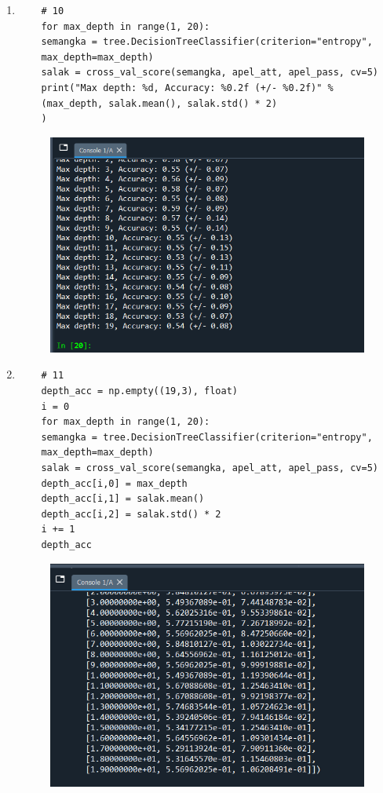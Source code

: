 \begin{enumerate}
\begin{figure}[!htbp]
\end{figure}
\item 
\begin{verbatim}
	# 10
	for max_depth in range(1, 20):
	semangka = tree.DecisionTreeClassifier(criterion="entropy", 
	max_depth=max_depth)
	salak = cross_val_score(semangka, apel_att, apel_pass, cv=5)
	print("Max depth: %d, Accuracy: %0.2f (+/- %0.2f)" % 
	(max_depth, salak.mean(), salak.std() * 2)
	)
\end{verbatim}
\begin{figure}[!htbp]
	\centering
	\includegraphics[scale=0.8]{figures/10.PNG}
\end{figure}
\newpage
\item
\begin{verbatim}
	# 11
	depth_acc = np.empty((19,3), float)
	i = 0
	for max_depth in range(1, 20):
	semangka = tree.DecisionTreeClassifier(criterion="entropy", 
	max_depth=max_depth)
	salak = cross_val_score(semangka, apel_att, apel_pass, cv=5)
	depth_acc[i,0] = max_depth
	depth_acc[i,1] = salak.mean()
	depth_acc[i,2] = salak.std() * 2
	i += 1
	depth_acc
\end{verbatim}
\begin{figure}[!htbp]
	\centering
	\includegraphics[scale=0.8]{figures/11.PNG}

\end{figure}
\end{enumerate}
